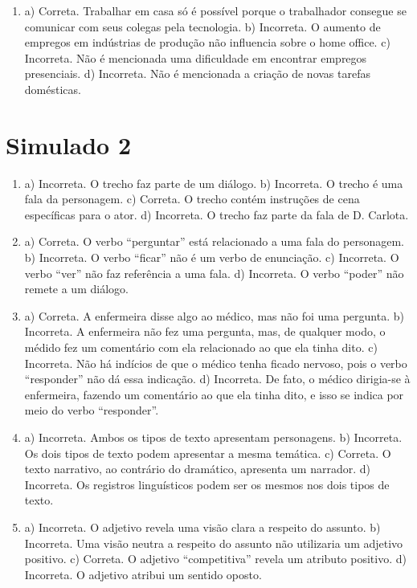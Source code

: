 \begin{enumerate}
\item
a) Correta. Trabalhar em casa só é possível porque o trabalhador
consegue se comunicar com seus colegas pela tecnologia.
b) Incorreta. O aumento de empregos em indústrias de produção não
influencia sobre o home office.
c) Incorreta. Não é mencionada uma dificuldade em encontrar empregos
presenciais.
d) Incorreta. Não é mencionada a criação de novas tarefas domésticas.
\end{enumerate}

\section*{Simulado 2}

\begin{enumerate}
\item
a) Incorreta. O trecho faz parte de um diálogo.
b) Incorreta. O trecho é uma fala da personagem.
c) Correta. O trecho contém instruções de cena específicas para o ator.
d) Incorreta. O trecho faz parte da fala de D. Carlota.

\item
a) Correta. O verbo “perguntar” está relacionado a uma fala do personagem.
b) Incorreta. O verbo “ficar” não é um verbo de enunciação.
c) Incorreta. O verbo “ver” não faz referência a uma fala.
d) Incorreta. O verbo “poder” não remete a um diálogo.

\item
a) Correta. A enfermeira disse algo ao médico, mas não foi uma pergunta.
b) Incorreta. A enfermeira não fez uma pergunta, mas, de qualquer modo, o médido fez um comentário com ela relacionado ao que ela tinha dito.
c) Incorreta. Não há indícios de que o médico tenha ficado nervoso, pois o verbo “responder” não dá essa indicação.
d) Incorreta. De fato, o médico dirigia-se à enfermeira, fazendo um comentário ao que ela tinha dito, e isso se indica por meio do verbo “responder”.

\item
a) Incorreta. Ambos os tipos de texto apresentam personagens.
b) Incorreta. Os dois tipos de texto podem apresentar a mesma temática.
c) Correta. O texto narrativo, ao contrário do dramático, apresenta um narrador.
d) Incorreta. Os registros linguísticos podem ser os mesmos nos dois tipos de texto.

\item
a) Incorreta. O adjetivo revela uma visão clara a respeito do assunto.
b) Incorreta. Uma visão neutra a respeito do assunto não utilizaria um adjetivo positivo.
c) Correta. O adjetivo “competitiva” revela um atributo positivo.
d) Incorreta. O adjetivo atribui um sentido oposto.


\end{enumerate}
